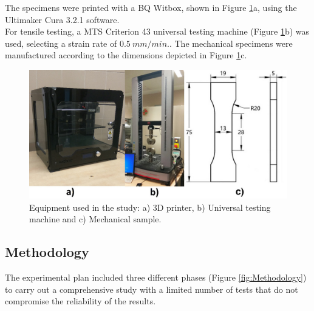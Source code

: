 \documentclass[
  12pt]{article}
\begin{document}
The specimens were printed with a BQ Witbox, shown in Figure \ref{fig:machine}a, using the Ultimaker Cura 3.2.1 software.\\
For tensile testing, a MTS Criterion 43 universal testing machine (Figure \ref{fig:machine}b) was used, selecting a strain rate of \(0.5~mm/min.\).
The mechanical specimens were manufactured according to the dimensions depicted in Figure \ref{fig:machine}c.

\begin{figure}

{\centering \includegraphics[width=0.9\linewidth]{Figures/Machine-probeta} 

}

\caption{Equipment used in the study: a) 3D printer, b) Universal testing machine and c) Mechanical sample.}\label{fig:machine}
\end{figure}

\hypertarget{methodology}{%
\subsection{Methodology}\label{methodology}}

The experimental plan included three different phases (Figure \ref{fig:Methodology}) to carry out a comprehensive study with a limited number of tests that do not compromise the reliability of the results.
\end{document}
